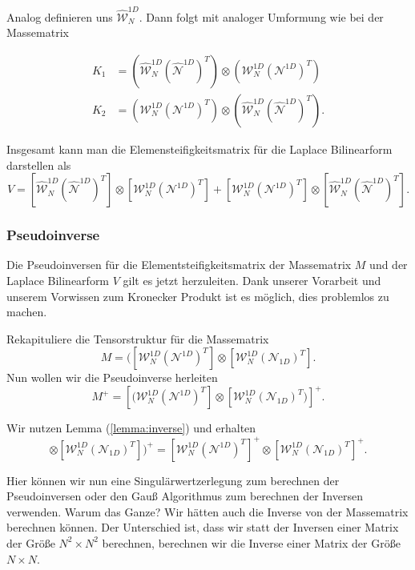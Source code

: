 Analog definieren uns $\widehat{\mathcal{W}}^{1D}_N$.
Dann folgt mit analoger Umformung wie bei der Massematrix


\begin{align*}
K_1 &= (\widehat{\mathcal{W}}_N^{1D} (\widehat{\mathcal{N}}^{1D})^T) \otimes (\mathcal{W}_N^{1D}(\mathcal{N}^{1D})^T) \\
K_2 &= (\mathcal{W}_N^{1D} (\mathcal{N}^{1D})^T) \otimes (\widehat{\mathcal{W}}_N^{1D} (\widehat{\mathcal{N}}^{1D})^T).
\end{align*}



Insgesamt kann man die Elemensteifigkeitsmatrix für die Laplace Bilinearform darstellen als
\begin{equation}
V =[\widehat{\mathcal{W}}_N^{1D} (\widehat{\mathcal{N}}^{1D})^T] \otimes [\mathcal{W}_N^{1D} (\mathcal{N}^{1D})^T] + [\mathcal{W}_N^{1D} (\mathcal{N}^{1D})^T] \otimes [\widehat{\mathcal{W}}_N^{1D} (\widehat{\mathcal{N}}^{1D})^T].
\end{equation}


\subsubsection{Pseudoinverse}

Die Pseudoinversen für die Elementsteifigkeitsmatrix der Massematrix $M$ und der Laplace Bilinearform $V$ gilt es jetzt herzuleiten. Dank unserer Vorarbeit und unserem Vorwissen zum Kronecker Produkt ist es möglich, dies problemlos zu machen.

Rekapituliere die Tensorstruktur für die Massematrix
\begin{equation}
M =  ([\mathcal{W}_N^{1D} (\mathcal{N}^{1D})^T] \otimes [\mathcal{W}_N^{1D} (\mathcal{N}_{1D})^T].
\end{equation}
Nun wollen wir die Pseudoinverse herleiten
\begin{equation}
M^+=  [(\mathcal{W}_N^{1D} (\mathcal{N}^{1D})^T] \otimes [\mathcal{W}_N^{1D} (\mathcal{N}_{1D})^T)]^+ .
\end{equation}

Wir nutzen Lemma (\ref{lemma:inverse}) und erhalten
\begin{equation}
[(\mathcal{W}_N^{1D} (\mathcal{N}^{1D})^T] \otimes [\mathcal{W}_N^{1D} (\mathcal{N}_{1D})^T])^+ =  [\mathcal{W}_N^{1D} (\mathcal{N}^{1D})^T]^+ \otimes [\mathcal{W}_N^{1D} (\mathcal{N}_{1D})^T]^+.
\end{equation}

Hier können wir nun eine Singulärwertzerlegung zum berechnen der Pseudoinversen oder den Gauß Algorithmus zum berechnen der Inversen verwenden. Warum das Ganze? Wir hätten auch die Inverse von der Massematrix berechnen können. Der Unterschied ist, dass wir statt der Inversen einer Matrix der Größe $N^2 \times N^2$ berechnen, berechnen wir die Inverse einer Matrix der Größe $N \times N$.

